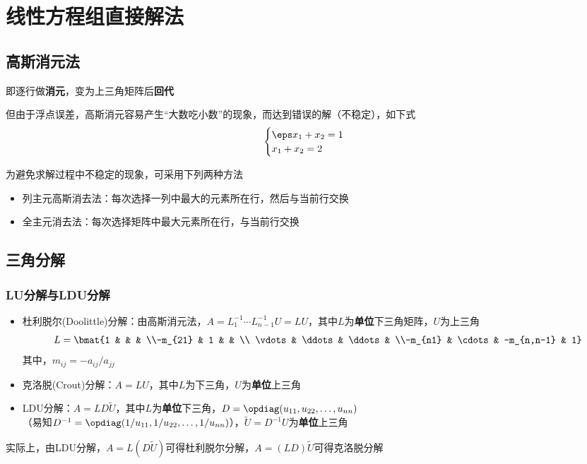 
\section{线性方程组直接解法}
\subsection{高斯消元法}
即逐行做\textbf{消元}，变为上三角矩阵后\textbf{回代}

但由于浮点误差，高斯消元容易产生``大数吃小数''的现象，而达到错误的解（不稳定），如下式
\[\begin{cases}
    \eps x_1+x_2=1\\
    x_1+x_2=2
\end{cases}\]

为避免求解过程中不稳定的现象，可采用下列两种方法
\begin{itemize}
    \item 列主元高斯消去法：每次选择一列中最大的元素所在行，然后与当前行交换
    \item 全主元消去法：每次选择矩阵中最大元素所在行，与当前行交换
\end{itemize}

\subsection{三角分解}
\subsubsection{LU分解与LDU分解}
\begin{itemize}
\item 杜利脱尔(Doolittle)分解：由高斯消元法，$A=L_1^{-1}\cdots L_{n-1}^{-1}U=LU$，其中$L$为\textbf{单位}下三角矩阵，$U$为上三角
\[L=\bmat{1 & & & \\-m_{21} & 1 & & \\ \vdots & \ddots & \ddots & \\-m_{n1} & \cdots & -m_{n,n-1} & 1}\]
其中，$m_{ij}=-a_{ij}/a_{jj}$
\item 克洛脱(Crout)分解：$A=LU$，其中$L$为下三角，$U$为\textbf{单位}上三角
\item LDU分解：$A=LD\tilde{U}$，其中$L$为\textbf{单位}下三角，$D=\opdiag(u_{11},u_{22},\ldots,u_{nn})$\\
（易知$D^{-1}=\opdiag(1/u_{11},1/u_{22},\ldots,1/u_{nn})$），$\tilde{U}=D^{-1}U$为\textbf{单位}上三角
\end{itemize}
实际上，由LDU分解，$A=L(D\tilde{U})$可得杜利脱尔分解，$A=(LD)\tilde{U}$可得克洛脱分解

